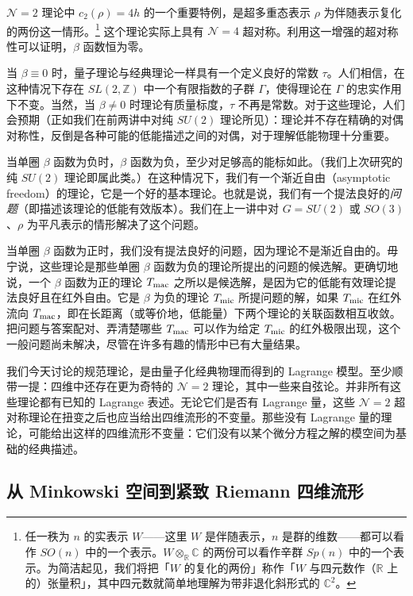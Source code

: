 $\mathcal{N}=2$ 理论中 $c_2(\rho)=4h$ 的一个重要特例，是超多重态表示 $\rho$ 为伴随表示复化的两份这一情形。\footnote{任一秩为 $n$ 的实表示 $W$——这里 $W$ 是伴随表示，$n$ 是群的维数——都可以看作 $SO(n)$ 中的一个表示。$W\otimes_{\mathbb{R}}\mathbb{C}$ 的两份可以看作辛群 $Sp(n)$ 中的一个表示。为简洁起见，我们将把「$W$ 的复化的两份」称作「$W$ 与四元数作（$\mathbb{R}$ 上的）张量积」，其中四元数就简单地理解为带非退化斜形式的 $\mathbb{C}^2$。} 这个理论实际上具有 $\mathcal{N}=4$ 超对称。利用这一增强的超对称性可以证明，$\beta$ 函数恒为零。

当 $\beta\equiv0$ 时，量子理论与经典理论一样具有一个定义良好的常数 $\tau$。人们相信，在这种情况下存在 $SL(2,\mathbb{Z})$ 中一个有限指数的子群 $\Gamma$，使得理论在 $\Gamma$ 的忠实作用下不变。当然，当 $\beta\ne0$ 时理论有质量标度，$\tau$ 不再是常数。对于这些理论，人们会预期（正如我们在前两讲中对纯 $SU(2)$ 理论所见）：理论并不存在精确的对偶对称性，反倒是各种可能的低能描述之间的对偶，对于理解低能物理十分重要。

当单圈 $\beta$ 函数为负时，$\beta$ 函数为负，至少对足够高的能标如此。（我们上次研究的纯 $SU(2)$ 理论即属此类。）在这种情况下，我们有一个渐近自由（asymptotic freedom）的理论，它是一个好的基本理论。也就是说，我们有一个提法良好的\emph{问题}（即描述该理论的低能有效版本）。我们在上一讲中对 $G=SU(2)$ 或 $SO(3)$、$\rho$ 为平凡表示的情形解决了这个问题。

当单圈 $\beta$ 函数为正时，我们没有提法良好的问题，因为理论不是渐近自由的。毋宁说，这些理论是那些单圈 $\beta$ 函数为负的理论所提出的问题的候选解。更确切地说，一个 $\beta$ 函数为正的理论 $T_{\rm mac}$ 之所以是候选解，是因为它的低能有效理论提法良好且在红外自由。它是 $\beta$ 为负的理论 $T_{\rm mic}$ 所提问题的解，如果 $T_{\rm mic}$ 在红外流向 $T_{\rm mac}$，即在长距离（或等价地，低能量）下两个理论的关联函数相互收敛。把问题与答案配对、弄清楚哪些 $T_{\rm mac}$ 可以作为给定 $T_{\rm mic}$ 的红外极限出现，这个一般问题尚未解决，尽管在许多有趣的情形中已有大量结果。

我们今天讨论的规范理论，是由量子化经典物理而得到的 Lagrange 模型。至少顺带一提：四维中还存在更为奇特的 $\mathcal{N}=2$ 理论，其中一些来自弦论。并非所有这些理论都有已知的 Lagrange 表述。无论它们是否有 Lagrange 量，这些 $\mathcal{N}=2$ 超对称理论在扭变之后也应当给出四维流形的不变量。那些没有 Lagrange 量的理论，可能给出这样的四维流形不变量：它们没有以某个微分方程之解的模空间为基础的经典描述。

\subsection{从 Minkowski 空间到紧致 Riemann 四维流形}

